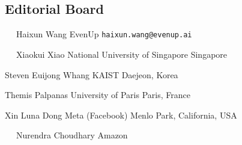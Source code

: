 \documentclass[10pt,twocolumn]{article}
\begin{document}
\pagestyle{empty}

\subsection*{Editorial Board}

\begin{description}[style=unboxed,leftmargin=.2cm]
\item[{\bf Editor-in-Chief}]
\verb-  -                      \newline
Haixun Wang                 \newline
EvenUp             \newline
\verb+haixun.wang@evenup.ai+ \newline
\vspace{-.6cm}

\item[{\bf Associate Editors}] 
\verb-  -                     \newline
Xiaokui Xiao\newline
National University of Singapore \newline
Singapore\newline

\vspace{-.5cm}
Steven Euijong Whang\newline
KAIST\newline
Daejeon, Korea\newline

\vspace{-.5cm}
Themis Palpanas\newline
University of Paris\newline 
Paris, France\newline

\vspace{-.5cm}
Xin Luna Dong\newline
Meta (Facebook)\newline 
Menlo Park, California, USA\newline
\vspace{-.6cm}

\item[{\bf Production Editor}]
\verb-  -                     \newline
Nurendra Choudhary\newline
Amazon\newline 
\vspace{-.6cm}


\end{description}
\end{document}
